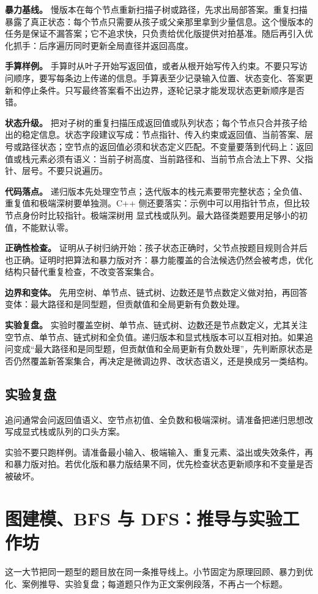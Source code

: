 \textbf{暴力基线。} 慢版本在每个节点重新扫描子树或路径，先求出局部答案。重复扫描暴露了真正状态：每个节点只需要从孩子或父亲那里拿到少量信息。这个慢版本的任务是保证不漏答案；它不追求快，只负责给优化版提供对拍基准。随后再引入优化抓手：后序遍历同时更新全局直径并返回高度。

\textbf{手算样例。} 手算时从叶子开始写返回值，或者从根开始写传入约束。不要只写访问顺序，要写每条边上传递的信息。手算表至少记录输入位置、状态变化、答案更新和停止条件。只写最终答案看不出边界，逐轮记录才能发现状态更新顺序是否错。

\textbf{状态升级。} 把对子树的重复扫描压成返回值或队列状态；每个节点只合并孩子给出的稳定信息。状态字段建议写成：节点指针、传入约束或返回值、当前答案、层号或路径状态；空节点的返回值必须和状态定义匹配。不变量要落到代码上：返回值或栈元素必须有语义：当前子树高度、当前路径和、当前节点合法上下界、父指针、层号。不要只说遍历。

\textbf{代码落点。} 递归版本先处理空节点；迭代版本的栈元素要带完整状态；全负值、重复值和极端深树要单独测。C++ 侧还要落实：示例中可以用指针节点，但比较节点身份时比较指针。极端深树用  显式栈或队列。最大路径类题要用足够小的初值，不能默认零。

\textbf{正确性检查。} 证明从子树归纳开始：孩子状态正确时，父节点按题目规则合并后也正确。证明时把算法和暴力版对齐：暴力能覆盖的合法候选仍然会被考虑，优化结构只替代重复检查，不改变答案集合。

\textbf{边界和变体。} 先用空树、单节点、链式树、边数还是节点数定义做对拍，再回答变体：最大路径和是同型题，但贡献值和全局更新有负数处理。

\textbf{实验复盘。} 实验时覆盖空树、单节点、链式树、边数还是节点数定义，尤其关注空节点、单节点、链式树和全负值。递归版本和显式栈版本可以互相对拍。如果追问变成“最大路径和是同型题，但贡献值和全局更新有负数处理”，先判断原状态是否仍然覆盖新答案集合，再决定是微调边界、改状态语义，还是换成另一类结构。

\subsection{实验复盘}

追问通常会问返回值语义、空节点初值、全负数和极端深树。请准备把递归思想改写成显式栈或队列的口头方案。

实验不要只跑样例。请准备最小输入、极端输入、重复元素、溢出或失效条件，再和暴力版对拍。若优化版和暴力版结果不同，优先检查状态更新顺序和不变量是否被破坏。

\section{图建模、BFS 与 DFS：推导与实验工作坊}
这一大节把同一题型的题目放在同一条推导线上。小节固定为原理回顾、暴力到优化、案例推导、实验复盘；每道题只作为正文案例段落，不再占一个标题。

